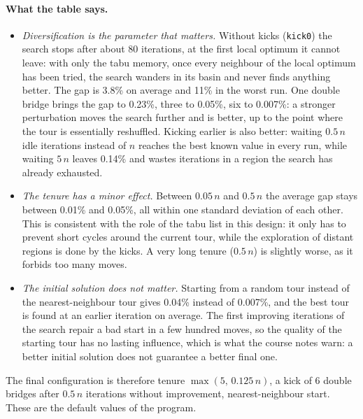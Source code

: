 \documentclass[11pt,a4paper]{article}
\begin{document}
\paragraph{What the table says.}
\begin{itemize}
  \item \emph{Diversification is the parameter that matters.} Without kicks
    (\texttt{kick0}) the search stops after about 80 iterations, at the first local optimum it
    cannot leave: with only the tabu memory, once every neighbour of the local optimum has
    been tried, the search wanders in its basin and never finds anything better. The gap is
    3.8\% on average and 11\% in the worst run. One double bridge brings the gap to 0.23\%,
    three to 0.05\%, six to 0.007\%: a stronger perturbation moves the search further and
    is better, up to the point where the tour is essentially reshuffled. Kicking earlier is
    also better: waiting $0.5\,n$ idle iterations instead of $n$ reaches the best known value
    in every run, while waiting $5\,n$ leaves 0.14\% and wastes iterations in a region the
    search has already exhausted.
  \item \emph{The tenure has a minor effect.} Between $0.05\,n$ and $0.5\,n$ the average gap
    stays between 0.01\% and 0.05\%, all within one standard deviation of each other. This is
    consistent with the role of the tabu list in this design: it only has to prevent short
    cycles around the current tour, while the exploration of distant regions is done by the
    kicks. A very long tenure ($0.5\,n$) is slightly worse, as it forbids too many moves.
  \item \emph{The initial solution does not matter.} Starting from a random tour instead of
    the nearest-neighbour tour gives 0.04\% instead of 0.007\%, and the best tour is found
    at an earlier iteration on average. The first improving iterations of the search repair
    a bad start in a few hundred moves, so the quality of the starting tour has no lasting
    influence, which is what the course notes warn: a better initial solution does not
    guarantee a better final one.
\end{itemize}
The final configuration is therefore tenure $\max(5,\,0.125\,n)$, a kick of 6 double bridges
after $0.5\,n$ iterations without improvement, nearest-neighbour start. These are the default
values of the program.
\end{document}
